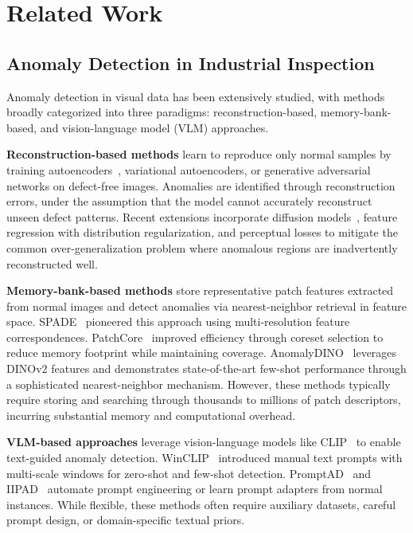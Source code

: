 \section{Related Work}
\label{sec:related}

\subsection{Anomaly Detection in Industrial Inspection}

Anomaly detection in visual data has been extensively studied, with methods broadly categorized into three paradigms: reconstruction-based, memory-bank-based, and vision-language model (VLM) approaches.

\textbf{Reconstruction-based methods} learn to reproduce only normal samples by training autoencoders~\cite{Bergmann2019MVTec}, variational autoencoders, or generative adversarial networks on defect-free images.
Anomalies are identified through reconstruction errors, under the assumption that the model cannot accurately reconstruct unseen defect patterns.
Recent extensions incorporate diffusion models~\cite{He2023FastRecon}, feature regression with distribution regularization, and perceptual losses to mitigate the common over-generalization problem where anomalous regions are inadvertently reconstructed well.

\textbf{Memory-bank-based methods} store representative patch features extracted from normal images and detect anomalies via nearest-neighbor retrieval in feature space.
SPADE~\cite{Cohen2022SPADE} pioneered this approach using multi-resolution feature correspondences.
PatchCore~\cite{Roth2022PatchCore} improved efficiency through coreset selection to reduce memory footprint while maintaining coverage.
AnomalyDINO~\cite{Deng2024AnomalyDINO} leverages DINOv2 features and demonstrates state-of-the-art few-shot performance through a sophisticated nearest-neighbor mechanism.
However, these methods typically require storing and searching through thousands to millions of patch descriptors, incurring substantial memory and computational overhead.

\textbf{VLM-based approaches} leverage vision-language models like CLIP~\cite{Radford2021CLIP} to enable text-guided anomaly detection.
WinCLIP~\cite{Huang2022WinCLIP} introduced manual text prompts with multi-scale windows for zero-shot and few-shot detection.
PromptAD~\cite{Li2024PromptAD} and IIPAD~\cite{Zhang2024IIPAD} automate prompt engineering or learn prompt adapters from normal instances.
While flexible, these methods often require auxiliary datasets, careful prompt design, or domain-specific textual priors.


